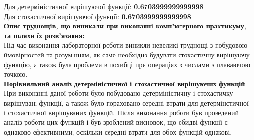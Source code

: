 Для детерміністичної вирішуючої функції: \textbf{0.6703999999999998} 
\\

Для стохастичної вирішуючої функції: \textbf{0.6703999999999998} 
\\


\textbf{Опис труднощiв, що виникали при виконаннi комп’ютерного практикуму, та шляхи їх розв’язання:}
\\

Під час виконання лабораторної роботи виникли невеликі труднощі з побудовою ймовірностей та розумінням, як саме необхідно будувати стохастичну вирішуючу функцію, а також була проблема в похибці при операціях з числами з плаваючою точкою.
\\  

\textbf{Порівняльний аналіз детерміністичної і стохастичної вирішуючих функцій}
\\

При виконанні даної роботи було побудовано детерміністичну і стохастичку вирішувані функції, а також було пораховано середні втрати для детермінстичної і стохастичної вирішуваних функцій. Після виконання роботи був проведений аналіз роботи цих функцій і був зроблений висновок, що обидві функції є однаково ефективними, оскільки середні втрати для обох функцій однакові.